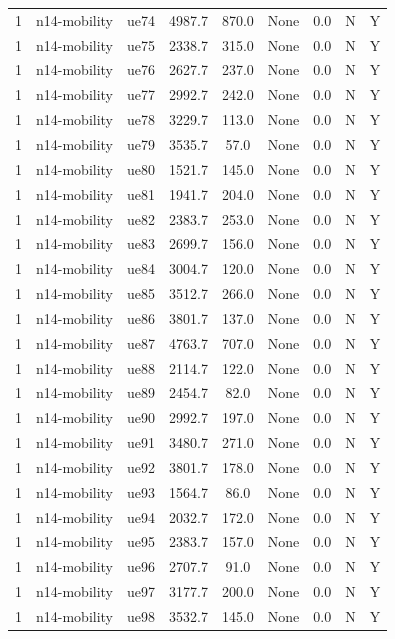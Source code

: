 \begin{table}[ht]
\begin{tabular}{|c|c|c|c|c|c|c|c|c|}
1 & n14-mobility & ue74 & 4987.7 & 870.0 & None & 0.0 & N & Y \\
1 & n14-mobility & ue75 & 2338.7 & 315.0 & None & 0.0 & N & Y \\
1 & n14-mobility & ue76 & 2627.7 & 237.0 & None & 0.0 & N & Y \\
1 & n14-mobility & ue77 & 2992.7 & 242.0 & None & 0.0 & N & Y \\
1 & n14-mobility & ue78 & 3229.7 & 113.0 & None & 0.0 & N & Y \\
1 & n14-mobility & ue79 & 3535.7 & 57.0 & None & 0.0 & N & Y \\
1 & n14-mobility & ue80 & 1521.7 & 145.0 & None & 0.0 & N & Y \\
1 & n14-mobility & ue81 & 1941.7 & 204.0 & None & 0.0 & N & Y \\
1 & n14-mobility & ue82 & 2383.7 & 253.0 & None & 0.0 & N & Y \\
1 & n14-mobility & ue83 & 2699.7 & 156.0 & None & 0.0 & N & Y \\
1 & n14-mobility & ue84 & 3004.7 & 120.0 & None & 0.0 & N & Y \\
1 & n14-mobility & ue85 & 3512.7 & 266.0 & None & 0.0 & N & Y \\
1 & n14-mobility & ue86 & 3801.7 & 137.0 & None & 0.0 & N & Y \\
1 & n14-mobility & ue87 & 4763.7 & 707.0 & None & 0.0 & N & Y \\
1 & n14-mobility & ue88 & 2114.7 & 122.0 & None & 0.0 & N & Y \\
1 & n14-mobility & ue89 & 2454.7 & 82.0 & None & 0.0 & N & Y \\
1 & n14-mobility & ue90 & 2992.7 & 197.0 & None & 0.0 & N & Y \\
1 & n14-mobility & ue91 & 3480.7 & 271.0 & None & 0.0 & N & Y \\
1 & n14-mobility & ue92 & 3801.7 & 178.0 & None & 0.0 & N & Y \\
1 & n14-mobility & ue93 & 1564.7 & 86.0 & None & 0.0 & N & Y \\
1 & n14-mobility & ue94 & 2032.7 & 172.0 & None & 0.0 & N & Y \\
1 & n14-mobility & ue95 & 2383.7 & 157.0 & None & 0.0 & N & Y \\
1 & n14-mobility & ue96 & 2707.7 & 91.0 & None & 0.0 & N & Y \\
1 & n14-mobility & ue97 & 3177.7 & 200.0 & None & 0.0 & N & Y \\
1 & n14-mobility & ue98 & 3532.7 & 145.0 & None & 0.0 & N & Y \\

\end{tabular}
\end{table}
